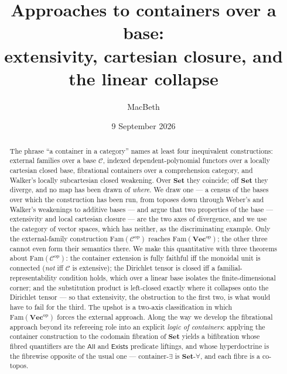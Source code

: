 \documentclass[11pt]{amsart}
\theoremstyle{plain}
\theoremstyle{definition}
\theoremstyle{remark}
\newcommand{\C}{\mathcal{C}}
\newcommand{\Set}{\mathbf{Set}}
\newcommand{\Vect}{\mathbf{Vec}}
\newcommand{\Fam}{\mathrm{Fam}}
\newcommand{\op}{\mathrm{op}}
\begin{document}
\title[Approaches to containers over a base]{Approaches to containers over a base:\\
extensivity, cartesian closure, and the linear collapse}

\author{MacBeth}
\address{Kodamai}

\date{9 September 2026}

\begin{abstract}
The phrase ``a container in a category'' names at least four inequivalent constructions:
external families over a base $\C$, indexed dependent-polynomial functors over a locally
cartesian closed base, fibrational containers over a comprehension category, and Walker's
locally subcartesian closed weakening. Over $\Set$ they coincide; off $\Set$ they diverge, and
no map has been drawn of \emph{where}. We draw one --- a census of the bases over which the
construction has been run, from toposes down through Weber's and Walker's weakenings to additive
bases --- and argue that two properties of the base --- extensivity
and local cartesian closure --- are the two axes of divergence, and we use the category of vector
spaces, which has neither, as the discriminating example. Only the external-family construction
$\Fam(\C^\op)$ reaches $\Fam(\Vect^\op)$; the other three cannot even form their semantics there.
We make this quantitative with three theorems about $\Fam(\C^\op)$: the container extension is fully
faithful iff the monoidal unit is connected (\emph{not} iff $\C$ is extensive); the Dirichlet tensor
is closed iff a familial-representability condition holds, which over a linear base isolates the
finite-dimensional corner; and the substitution product is left-closed exactly where it collapses
onto the Dirichlet tensor --- so that extensivity, the obstruction to the first two, is what would
have to fail for the third. The upshot is a two-axis classification in which $\Fam(\Vect^\op)$ forces
the external approach. Along the way we develop the fibrational approach beyond its refereeing role
into an explicit \emph{logic of containers}: applying the container construction to the codomain
fibration of $\Set$ yields a bifibration whose fibred quantifiers are the $\mathsf{All}$ and
$\mathsf{Exists}$ predicate liftings, and whose hyperdoctrine is the fibrewise opposite of the usual
one --- container-$\exists$ is $\Set$-$\forall$, and each fibre is a co-topos.
\end{abstract}

\maketitle
\end{document}
